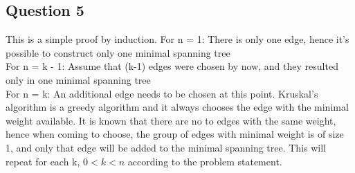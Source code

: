 \documentclass{article}
\begin{document}
\subsection*{Question 5}
This is a simple proof by induction.
For n = 1: There is only one edge, hence it's possible to construct only one
minimal spanning tree\\
For n = k - 1: Assume that (k-1) edges were chosen by now, and they resulted
only in one minimal spanning tree\\
For n = k: An additional edge needs to be chosen at this point. Kruskal's
algorithm is a greedy algorithm and it always chooses the edge with the minimal
weight available. It is known that there are no to edges with the same weight,
hence when coming to choose, the group of edges with minimal weight is of size
1, and only that edge will be added to the minimal spanning tree.
This will repeat for each k, $0 < k < n$ according to the problem statement.
\end{document}
